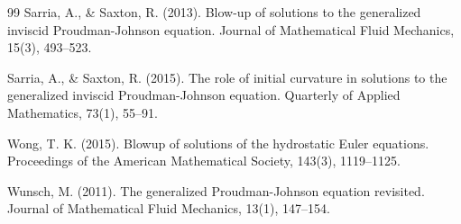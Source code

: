 \documentclass[12pt]{amsart}
\numberwithin{equation}{section}
\numberwithin{equation}{section}
\begin{document}
\begin{thebibliography}{99}
  Sarria, A., \& Saxton, R. (2013). Blow-up of solutions to the generalized inviscid Proudman-Johnson equation. Journal of Mathematical Fluid Mechanics, 15(3), 493--523.

 Sarria, A., \& Saxton, R. (2015). The role of initial curvature in solutions to the generalized inviscid Proudman-Johnson equation. Quarterly of Applied Mathematics, 73(1), 55--91.

 Wong, T. K. (2015). Blowup of solutions of the hydrostatic Euler equations. Proceedings of the American Mathematical Society, 143(3), 1119--1125.

  Wunsch, M. (2011). The generalized Proudman-Johnson equation revisited. Journal of Mathematical Fluid Mechanics, 13(1), 147--154.


\end{thebibliography}
\end{document}
